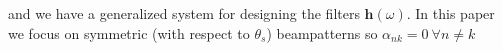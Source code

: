 \documentclass{article}
\begin{document}
and we have a generalized system for designing the filters $ \boldsymbol{h}(\omega) $. In this paper we focus on symmetric (with respect to $ \theta_s $) beampatterns so $ \alpha_{nk}=0 \ \forall n\neq k $ 
\end{document}
